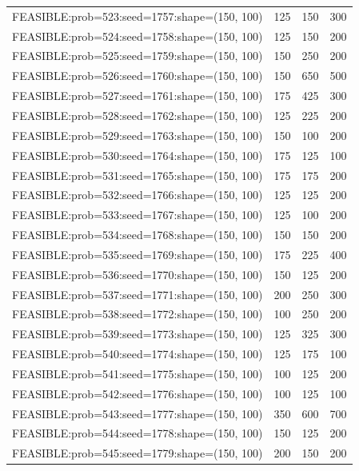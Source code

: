 \begin{longtable}{lccc}
FEASIBLE:prob=523:seed=1757:shape=(150, 100) &      125 &   150 &    300 \\
FEASIBLE:prob=524:seed=1758:shape=(150, 100) &      125 &   150 &    200 \\
FEASIBLE:prob=525:seed=1759:shape=(150, 100) &      150 &   250 &    200 \\
FEASIBLE:prob=526:seed=1760:shape=(150, 100) &      150 &   650 &    500 \\
FEASIBLE:prob=527:seed=1761:shape=(150, 100) &      175 &   425 &    300 \\
FEASIBLE:prob=528:seed=1762:shape=(150, 100) &      125 &   225 &    200 \\
FEASIBLE:prob=529:seed=1763:shape=(150, 100) &      150 &   100 &    200 \\
FEASIBLE:prob=530:seed=1764:shape=(150, 100) &      175 &   125 &    100 \\
FEASIBLE:prob=531:seed=1765:shape=(150, 100) &      175 &   175 &    200 \\
FEASIBLE:prob=532:seed=1766:shape=(150, 100) &      125 &   125 &    200 \\
FEASIBLE:prob=533:seed=1767:shape=(150, 100) &      125 &   100 &    200 \\
FEASIBLE:prob=534:seed=1768:shape=(150, 100) &      150 &   150 &    200 \\
FEASIBLE:prob=535:seed=1769:shape=(150, 100) &      175 &   225 &    400 \\
FEASIBLE:prob=536:seed=1770:shape=(150, 100) &      150 &   125 &    200 \\
FEASIBLE:prob=537:seed=1771:shape=(150, 100) &      200 &   250 &    300 \\
FEASIBLE:prob=538:seed=1772:shape=(150, 100) &      100 &   250 &    200 \\
FEASIBLE:prob=539:seed=1773:shape=(150, 100) &      125 &   325 &    300 \\
FEASIBLE:prob=540:seed=1774:shape=(150, 100) &      125 &   175 &    100 \\
FEASIBLE:prob=541:seed=1775:shape=(150, 100) &      100 &   125 &    200 \\
FEASIBLE:prob=542:seed=1776:shape=(150, 100) &      100 &   125 &    100 \\
FEASIBLE:prob=543:seed=1777:shape=(150, 100) &      350 &   600 &    700 \\
FEASIBLE:prob=544:seed=1778:shape=(150, 100) &      150 &   125 &    200 \\
FEASIBLE:prob=545:seed=1779:shape=(150, 100) &      200 &   150 &    200 \\

\end{longtable}
